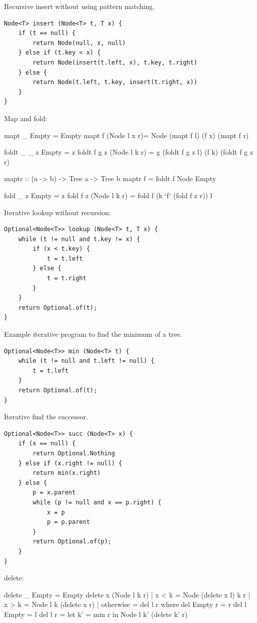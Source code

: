 \documentclass[b5paper]{article}
\begin{document}
Recursive insert without using pattern matching.

\begin{lstlisting}
Node<T> insert (Node<T> t, T x) {
    if (t == null) {
        return Node(null, x, null)
    } else if (t.key < x) {
        return Node(insert(t.left, x), t.key, t.right)
    } else {
        return Node(t.left, t.key, insert(t.right, x))
    }
}
\end{lstlisting}

Map and fold:

\begin{Haskell}
mapt _ Empty = Empty
mapt f (Node l x r)= Node (mapt f l) (f x) (mapt f r)

foldt _ _ z Empty = z
foldt f g z (Node l k r) = g (foldt f g z l) (f k) (foldt f g z r)

maptr :: (a -> b) -> Tree a -> Tree b
maptr f = foldt f Node Empty

fold _ z Empty = z
fold f z (Node l k r) = fold f (k `f` (fold f z r)) l
\end{Haskell}

Iterative lookup without recursion:

\begin{lstlisting}
Optional<Node<T>> lookup (Node<T> t, T x) {
    while (t != null and t.key != x) {
        if (x < t.key) {
            t = t.left
        } else {
            t = t.right
        }
    }
    return Optional.of(t);
}
\end{lstlisting}

Example iterative program to find the minimum of a tree.

\begin{lstlisting}
Optional<Node<T>> min (Node<T> t) {
    while (t != null and t.left != null) {
        t = t.left
    }
    return Optional.of(t);
}
\end{lstlisting}

Iterative find the successor.

\begin{lstlisting}
Optional<Node<T>> succ (Node<T> x) {
    if (x == null) {
        return Optional.Nothing
    } else if (x.right != null) {
        return min(x.right)
    } else {
        p = x.parent
        while (p != null and x == p.right) {
            x = p
            p = p.parent
        }
        return Optional.of(p);
    }
}
\end{lstlisting}

delete:

\begin{Haskell}
delete _ Empty = Empty
delete x (Node l k r) | x < k = Node (delete x l) k r
                      | x > k = Node l k (delete x r)
                      | otherwise = del l r
  where
    del Empty r = r
    del l Empty = l
    del l r = let k' = min r in Node l k' (delete k' r)
\end{Haskell}
\end{document}
